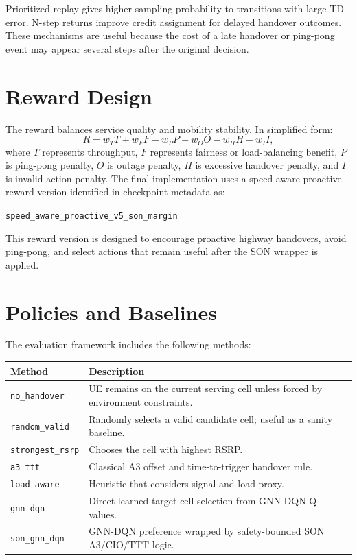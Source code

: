 \documentclass[12pt,a4paper]{report}
\newcommand{\method}{\texttt{son\_gnn\_dqn}}
\newcommand{\rawmethod}{\texttt{gnn\_dqn}}
\begin{document}
Prioritized replay gives higher sampling probability to transitions with large TD error. N-step returns improve credit assignment for delayed handover outcomes. These mechanisms are useful because the cost of a late handover or ping-pong event may appear several steps after the original decision.

\section{Reward Design}
The reward balances service quality and mobility stability. In simplified form:
\begin{equation}
    R = w_T T + w_F F - w_P P - w_O O - w_H H - w_I I,
\end{equation}
where $T$ represents throughput, $F$ represents fairness or load-balancing benefit, $P$ is ping-pong penalty, $O$ is outage penalty, $H$ is excessive handover penalty, and $I$ is invalid-action penalty. The final implementation uses a speed-aware proactive reward version identified in checkpoint metadata as:

\begin{center}
\texttt{speed\_aware\_proactive\_v5\_son\_margin}
\end{center}

This reward version is designed to encourage proactive highway handovers, avoid ping-pong, and select actions that remain useful after the SON wrapper is applied.

\section{Policies and Baselines}
The evaluation framework includes the following methods:

\begin{longtable}{p{}p{}}
\toprule
\textbf{Method} & \textbf{Description}\\
\midrule
\texttt{no\_handover} & UE remains on the current serving cell unless forced by environment constraints.\\
\texttt{random\_valid} & Randomly selects a valid candidate cell; useful as a sanity baseline.\\
\texttt{strongest\_rsrp} & Chooses the cell with highest RSRP.\\
\texttt{a3\_ttt} & Classical A3 offset and time-to-trigger handover rule.\\
\texttt{load\_aware} & Heuristic that considers signal and load proxy.\\
\rawmethod & Direct learned target-cell selection from GNN-DQN Q-values.\\
\method & GNN-DQN preference wrapped by safety-bounded SON A3/CIO/TTT logic.\\
\bottomrule
\end{longtable}
\end{document}

